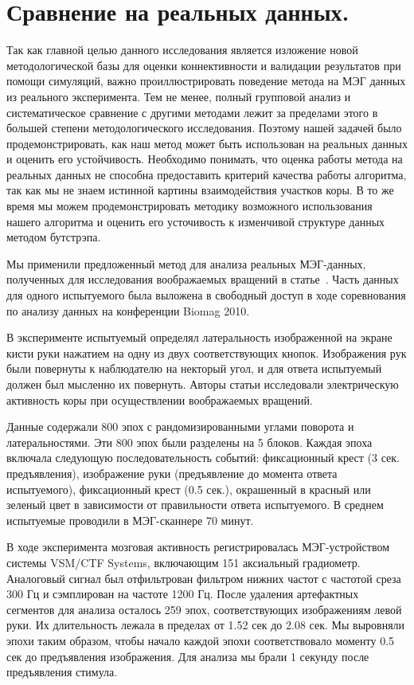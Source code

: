 \section{Сравнение на реальных данных.}\label{sec:validation_on_real_data}
Так как главной целью данного
исследования является изложение новой методологической базы для оценки
коннективности и валидации результатов при помощи симуляций, важно
проиллюстрировать поведение метода на МЭГ данных из реального эксперимента.
Тем не менее, полный групповой анализ и систематическое сравнение с другими
методами лежит за пределами этого в большей степени методологического исследования.
Поэтому нашей задачей было продемонстрировать, как наш метод может быть использован на
реальных данных и оценить его устойчивость.
Необходимо понимать, что оценка работы метода на
реальных данных не способна предоставить критерий качества работы алгоритма, так как
мы не знаем истинной картины взаимодействия участков коры. В то же время мы можем
продемонстрировать методику возможного использования нашего алгоритма и оценить
его усточивость к изменчивой структуре данных методом бутстрэпа.

Мы применили предложенный метод для анализа реальных МЭГ-данных, полученных для
исследования воображаемых вращений в статье~\cite{DeLange2008}. Часть данных
для одного испытуемого была выложена в свободный доступ в ходе соревнования по
анализу данных на конференции Biomag 2010.

В эксперименте испытуемый определял латеральность изображенной на экране кисти
руки нажатием на одну из двух соответствующих кнопок.  Изображения рук были
повернуты к наблюдателю на некторый угол, и для ответа испытуемый должен был
мысленно их повернуть. Авторы статьи исследовали электрическую активность коры
при осуществлении воображаемых вращений.

Данные содержали 800 эпох с рандомизированными углами поворота и
латеральностями. Эти 800 эпох были разделены на 5 блоков. Каждая эпоха включала
следующую последовательность событий: фиксационный крест (3 сек. предъявления),
изображение руки (предъявление до момента ответа испытуемого), фиксационный
крест (0.5 сек.), окрашенный в красный или зеленый цвет в зависимости от
правильности ответа испытуемого. В среднем испытуемые проводили в МЭГ-сканнере
70 минут.

В ходе эксперимента мозговая активность регистрировалась МЭГ-устройством
системы VSM/CTF Systems, включающим 151 аксиальный градиометр. Аналоговый
сигнал был отфильтрован  фильтром нижних частот с частотой среза 300 Гц и
сэмплирован на частоте 1200 Гц. После удаления артефактных сегментов для
анализа осталось 259 эпох, соответствующих изображениям левой руки. Их
длительность лежала в пределах от 1.52 сек до 2.08 сек. Мы выровняли эпохи
таким образом, чтобы начало каждой эпохи соответствовало моменту 0.5 сек до
предъявления изображения. Для анализа мы брали 1 секунду после предъявления
стимула.

